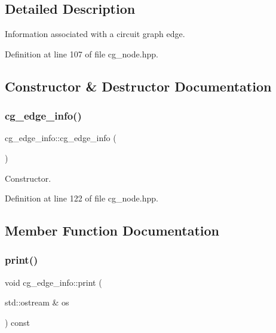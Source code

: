 \subsection{Detailed Description}
Information associated with a circuit graph edge. 

Definition at line 107 of file cg\+\_\+node.\+hpp.



\subsection{Constructor \& Destructor Documentation}
\mbox{\label{structcg__edge__info_adeb30c819cc2b97c5190953c9232051c}} 
\subsubsection{\texorpdfstring{cg\+\_\+edge\+\_\+info()}{cg\_edge\_info()}}
{\footnotesize\ttfamily cg\+\_\+edge\+\_\+info\+::cg\+\_\+edge\+\_\+info (\begin{DoxyParamCaption}{ }\end{DoxyParamCaption})\hspace{0.3cm}{\ttfamily [inline]}}



Constructor. 



Definition at line 122 of file cg\+\_\+node.\+hpp.



\subsection{Member Function Documentation}
\mbox{\label{structcg__edge__info_aa13ae24ca61d06f84662a86227515b5d}} 
\subsubsection{\texorpdfstring{print()}{print()}}
{\footnotesize\ttfamily void cg\+\_\+edge\+\_\+info\+::print (\begin{DoxyParamCaption}\item[{std\+::ostream \&}]{os }\end{DoxyParamCaption}) const}



